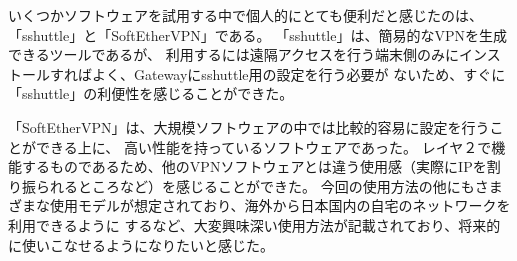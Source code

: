 \documentclass[11pt,a4j,titlepage]{jreport}
\begin{document}
いくつかソフトウェアを試用する中で個人的にとても便利だと感じたのは、「sshuttle」と「SoftEtherVPN」である。
「sshuttle」は、簡易的なVPNを生成できるツールであるが、
利用するには遠隔アクセスを行う端末側のみにインストールすればよく、Gatewayにsshuttle用の設定を行う必要が
ないため、すぐに「sshuttle」の利便性を感じることができた。\par
「SoftEtherVPN」は、大規模ソフトウェアの中では比較的容易に設定を行うことができる上に、
高い性能を持っているソフトウェアであった。
レイヤ２で機能するものであるため、他のVPNソフトウェアとは違う使用感（実際にIPを割り振られるところなど）を感じることができた。
今回の使用方法の他にもさまざまな使用モデルが想定されており、海外から日本国内の自宅のネットワークを利用できるように
するなど、大変興味深い使用方法が記載されており、将来的に使いこなせるようになりたいと感じた。





\end{document}

